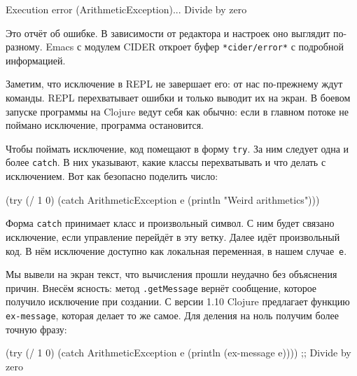 
\begin{english}
  \begin{text}
Execution error (ArithmeticException)...
Divide by zero
  \end{text}
\end{english}

Это отчёт об ошибке. В зависимости от редактора и настроек оно выглядит
по-разному. Emacs с модулем CIDER откроет буфер \texttt{*cider\-/error*}
с подробной информацией.


Заметим, что исключение в REPL не завершает его: от нас по-прежнему ждут
команды. REPL перехватывает ошибки и только выводит их на экран. В боевом
запуске программы на Clojure ведут себя как обычно: если в главном потоке не
поймано исключение, программа остановится.

Чтобы поймать исключение, код помещают в форму \verb|try|. За ним следует одна и
более \verb|catch|. В них указывают, какие классы перехватывать и что делать с
исключением. Вот как безопасно поделить число:


\begin{english}
  \begin{clojure}
(try
  (/ 1 0)
  (catch ArithmeticException e
    (println "Weird arithmetics")))
  \end{clojure}
\end{english}

Форма \verb|catch| принимает класс и произвольный символ. С ним будет связано
исключение, если управление перейдёт в эту ветку. Далее идёт произвольный код. В
нём исключение доступно как локальная переменная, в нашем случае~\verb|e|.


Мы вывели на экран текст, что вычисления прошли неудачно без объяснения
причин. Внесём ясность: метод \verb|.getMessage| вернёт сообщение, которое
получило исключение при создании. С версии 1.10 Clojure предлагает функцию
\verb|ex-message|, которая делает то же самое. Для деления на ноль получим более
точную фразу:

\begin{english}
  \begin{clojure}
(try
  (/ 1 0)
  (catch ArithmeticException e
    (println (ex-message e))))
;; Divide by zero
  \end{clojure}
\end{english}

